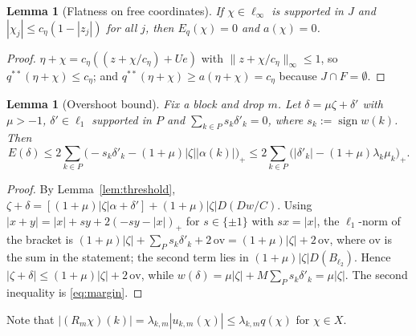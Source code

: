 \documentclass[10pt]{amsart}
\newtheorem{lemma}[theorem]{Lemma}
\theoremstyle{definition}
\theoremstyle{remark}
\newcommand{\sgn}{\operatorname{sign}}
\begin{document}
\begin{lemma}[Flatness on free coordinates]\label{lem:flat}
If $\chi\in\ell_\infty$ is supported in $J$ and $|\chi_j|\le
c_\eta(1-|z_j|)$ for all $j$, then $E_q(\chi)=0$ and $a(\chi)=0$.
\end{lemma}

\begin{proof}
$\eta+\chi=c_\eta((z+\chi/c_\eta)+Ue)$ with $\|z+\chi/c_\eta\|_\infty\le1$,
so $q^{**}(\eta+\chi)\le c_\eta$; and $q^{**}(\eta+\chi)\ge a(\eta+\chi)=
c_\eta$ because $J\cap F=\emptyset$.
\end{proof}

\begin{lemma}[Overshoot bound]\label{lem:overshoot}
Fix a block and drop $m$.  Let $\delta=\mu\zeta+\delta'$ with $\mu>-1$,
$\delta'\in\ell_1$ supported in $P$ and $\sum_{k\in P}s_k\delta'_k=0$, where
$s_k:=\sgn w(k)$.  Then
\[
 E(\delta)\le2\sum_{k\in P}\big(-s_k\delta'_k-(1+\mu)|\zeta||\alpha(k)|
 \big)_+\le2\sum_{k\in P}\big(|\delta'_k|-(1+\mu)\lambda_k\mu_k\big)_+ .
\]
\end{lemma}

\begin{proof}
By Lemma~\ref{lem:threshold}, $\zeta+\delta=[(1+\mu)|\zeta|\alpha+\delta']
+(1+\mu)|\zeta|D(Dw/C)$.  Using $|x+y|=|x|+sy+2(-sy-|x|)_+$ for $s\in\{\pm1\}$
with $sx=|x|$, the $\ell_1$-norm of the bracket is $(1+\mu)|\zeta|+
\sum_Ps_k\delta'_k+2\,\mathrm{ov}=(1+\mu)|\zeta|+2\,\mathrm{ov}$, where
$\mathrm{ov}$ is the sum in the statement; the second term lies in
$(1+\mu)|\zeta|D(B_{\ell_2})$.  Hence $|\zeta+\delta|\le(1+\mu)|\zeta|
+2\,\mathrm{ov}$, while $w(\delta)=\mu|\zeta|+M\sum_Ps_k\delta'_k=\mu|\zeta|$.
The second inequality is \eqref{eq:margin}.
\end{proof}

Note that $|(R_m\chi)(k)|=\lambda_{k,m}|u_{k,m}(\chi)|\le\lambda_{k,m}q(\chi)$
for $\chi\in X$.
\end{document}
